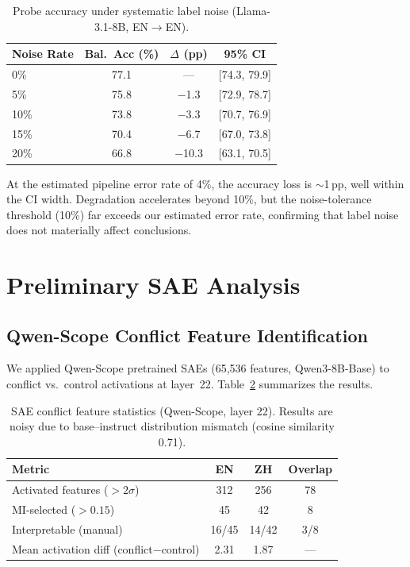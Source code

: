 \documentclass{article}
\begin{document}
\begin{table}[h]
\centering
\caption{Probe accuracy under systematic label noise (Llama-3.1-8B, EN$\to$EN).}
\label{tab:noise}
\begin{tabular}{lccc}
\toprule
Noise Rate & Bal.\ Acc (\%) & $\Delta$ (pp) & 95\% CI \\
\midrule
0\% & 77.1 & --- & [74.3, 79.9] \\
5\% & 75.8 & $-$1.3 & [72.9, 78.7] \\
10\% & 73.8 & $-$3.3 & [70.7, 76.9] \\
15\% & 70.4 & $-$6.7 & [67.0, 73.8] \\
20\% & 66.8 & $-$10.3 & [63.1, 70.5] \\
\bottomrule
\end{tabular}
\end{table}

At the estimated pipeline error rate of 4\%, the accuracy loss is $\sim$1\,pp, well within the CI width. Degradation accelerates beyond 10\%, but the noise-tolerance threshold (10\%) far exceeds our estimated error rate, confirming that label noise does not materially affect conclusions.

\section{Preliminary SAE Analysis}
\label{app:sae}

\subsection{Qwen-Scope Conflict Feature Identification}

We applied Qwen-Scope pretrained SAEs (65,536 features, Qwen3-8B-Base) to conflict vs.\ control activations at layer~22. Table~\ref{tab:sae} summarizes the results.

\begin{table}[h]
\centering
\caption{SAE conflict feature statistics (Qwen-Scope, layer 22). Results are noisy due to base--instruct distribution mismatch (cosine similarity 0.71).}
\label{tab:sae}
\begin{tabular}{lccc}
\toprule
Metric & EN & ZH & Overlap \\
\midrule
Activated features ($> 2\sigma$) & 312 & 256 & 78 \\
MI-selected ($> 0.15$) & 45 & 42 & 8 \\
Interpretable (manual) & 16/45 & 14/42 & 3/8 \\
Mean activation diff (conflict$-$control) & 2.31 & 1.87 & --- \\
\bottomrule
\end{tabular}
\end{table}
\end{document}
